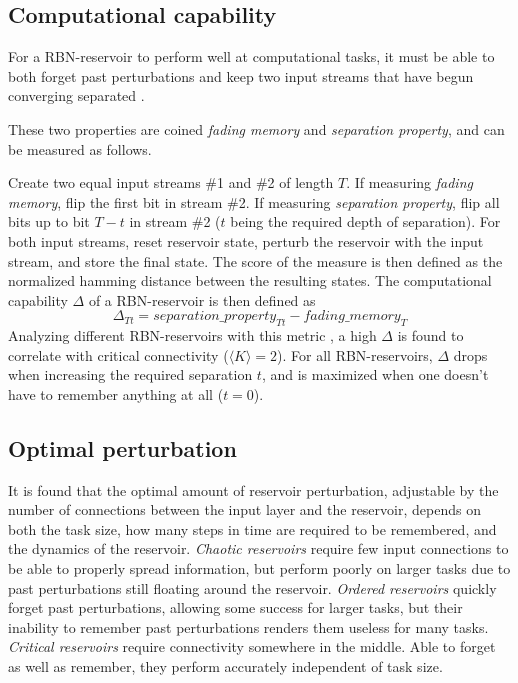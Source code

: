 \subsection{Computational capability}
\label{section:computational-capability}
For a RBN-reservoir to perform well at computational tasks,
it must be able to both forget past perturbations and keep two input streams that have begun converging separated \cite{bertschinger2004real}.

These two properties are coined \textit{fading memory} and \textit{separation property},
and can be measured \cite{rbn-reservoir} as follows.

Create two equal input streams \#1 and \#2 of length $T$.
If measuring \textit{fading memory}, flip the first bit in stream \#2.
If measuring \textit{separation property}, flip all bits up to bit $T-t$ in stream \#2
($t$ being the required depth of separation).
For both input streams, reset reservoir state, perturb the reservoir with the input stream,
and store the final state.
The score of the measure is then defined as the normalized hamming distance between the resulting states.
The computational capability $\Delta$ of a RBN-reservoir is then defined as
\begin{equation}
  \Delta_{Tt} = separation\_property_{Tt} - fading\_memory_{T}
\label{formula:accuracy}
\end{equation}
Analyzing different RBN-reservoirs with this metric \cite{rbn-reservoir},
a high $\Delta$ is found to correlate with critical connectivity ($\langle K \rangle = 2$).
For all RBN-reservoirs, $\Delta$ drops when increasing the required separation $t$,
and is maximized when one doesn't have to remember anything at all ($t=0$).

\subsection{Optimal perturbation}
\label{section:optimal-perturbance}
It is found that the optimal amount of reservoir perturbation,
adjustable by the number of connections between the input layer and the reservoir,
depends on both the task size, how many steps in time are required to be remembered,
and the dynamics of the reservoir.
\textit{Chaotic reservoirs} require few input connections to be able to properly spread information,
but perform poorly on larger tasks due to past perturbations still floating around the reservoir.
\textit{Ordered reservoirs} quickly forget past perturbations, allowing some success for larger tasks,
but their inability to remember past perturbations renders them useless for many tasks.
\textit{Critical reservoirs} require connectivity somewhere in the middle.
Able to forget as well as remember, they perform accurately independent of task size.


